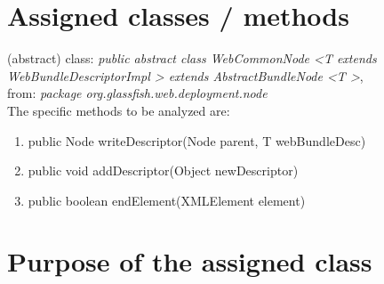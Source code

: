 \section{Assigned classes / methods} 
(abstract) class: \textit{public abstract class WebCommonNode \textless T extends WebBundleDescriptorImpl \textgreater 
extends AbstractBundleNode \textless T \textgreater}, \\
from: \textit{package org.glassfish.web.deployment.node} \\

\vspace{2mm}
The specific methods to be analyzed are:
\begin{enumerate}
 \item public Node writeDescriptor(Node parent, T webBundleDesc)
 \item public void addDescriptor(Object  newDescriptor)
 \item public boolean endElement(XMLElement element)
\end{enumerate}

\section{Purpose of the assigned class}
